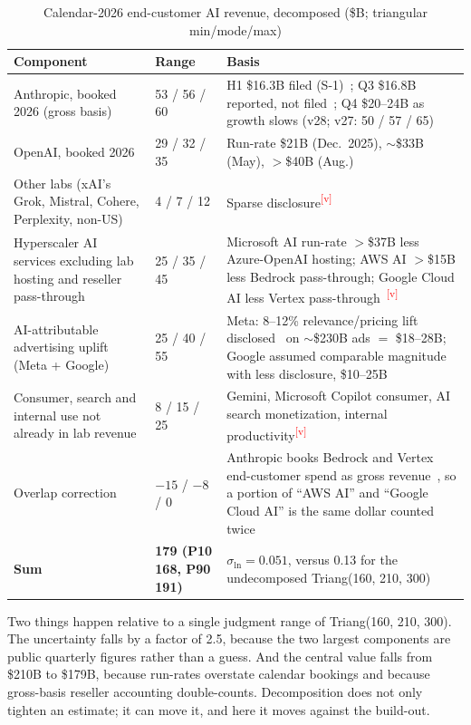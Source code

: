 \documentclass[11pt,letterpaper]{article}
\newcommand{\verify}{\textsuperscript{\textcolor{red}{[v]}}}
\begin{document}
\begin{table}[htbp]
\centering\small
\caption{Calendar-2026 end-customer AI revenue, decomposed (\$B; triangular min/mode/max)}
\label{tab:basedecomp}
\begin{tabularx}{\textwidth}{L{5.2cm}L{2.2cm}X}
\toprule
\textbf{Component} & \textbf{Range} & \textbf{Basis} \\
\midrule
Anthropic, booked 2026 (gross basis) & 53 / 56 / 60 & H1 \$16.3B filed (S-1)~\cite{ref:anthropic_s1}; Q3 \$16.8B reported, not filed~\cite{ref:cnbc_anthropic_q3}; Q4 \$20--24B as growth slows (v28; v27: 50 / 57 / 65) \\
OpenAI, booked 2026 & 29 / 32 / 35 & Run-rate \$21B (Dec.~2025), $\sim$\$33B (May), $>$\$40B (Aug.)~\cite{ref:epoch_revenue,ref:sacra_anthropic,ref:valueadd_openai} \\
Other labs (xAI's Grok, Mistral, Cohere, Perplexity, non-US) & 4 / 7 / 12 & Sparse disclosure\verify \\
Hyperscaler AI services excluding lab hosting and reseller pass-through & 25 / 35 / 45 & Microsoft AI run-rate $>$\$37B less Azure-OpenAI hosting; AWS AI $>$\$15B less Bedrock pass-through; Google Cloud AI less Vertex pass-through~\cite{ref:yahoo2026,ref:traderinsights2026}\verify \\
AI-attributable advertising uplift (Meta + Google) & 25 / 40 / 55 & Meta: 8--12\% relevance/pricing lift disclosed~\cite{ref:meta_q2_2026} on $\sim$\$230B ads $=$ \$18--28B; Google assumed comparable magnitude with less disclosure, \$10--25B \\
Consumer, search and internal use not already in lab revenue & 8 / 15 / 25 & Gemini, Microsoft Copilot consumer, AI search monetization, internal productivity\verify \\
Overlap correction & $-15$ / $-8$ / 0 & Anthropic books Bedrock and Vertex end-customer spend as gross revenue~\cite{ref:sacra_anthropic}, so a portion of ``AWS AI'' and ``Google Cloud AI'' is the same dollar counted twice \\
\midrule
\textbf{Sum} & \textbf{179 (P10 168, P90 191)} & $\sigma_{\ln}=0.051$, versus 0.13 for the undecomposed Triang(160, 210, 300) \\
\bottomrule
\end{tabularx}
\end{table}
Two things happen relative to a single judgment range of Triang(160, 210, 300). The uncertainty falls by a factor of 2.5, because the two largest components are public quarterly figures rather than a guess. And the central value falls from \$210B to \$179B, because run-rates overstate calendar bookings and because gross-basis reseller accounting double-counts. Decomposition does not only tighten an estimate; it can move it, and here it moves against the build-out.
\end{document}
